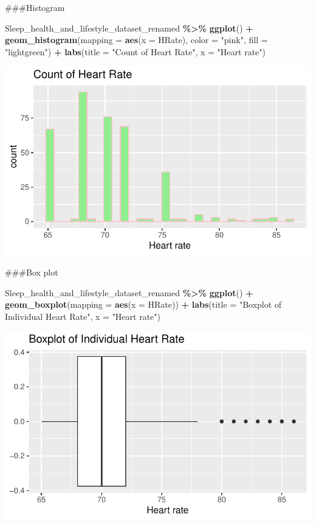 \documentclass[
  11pt,
]{article}
\newenvironment{Shaded}{\begin{snugshade}}{\end{snugshade}}
\newcommand{\AttributeTok}[1]{\textcolor[rgb]{0.13,0.29,0.53}{#1}}
\newcommand{\FunctionTok}[1]{\textcolor[rgb]{0.13,0.29,0.53}{\textbf{#1}}}
\newcommand{\NormalTok}[1]{#1}
\newcommand{\SpecialCharTok}[1]{\textcolor[rgb]{0.81,0.36,0.00}{\textbf{#1}}}
\newcommand{\StringTok}[1]{\textcolor[rgb]{0.31,0.60,0.02}{#1}}
\begin{document}
\#\#\#Histogram

\begin{Shaded}
\begin{Highlighting}[]
\NormalTok{Sleep\_health\_and\_lifestyle\_dataset\_renamed }\SpecialCharTok{\%\textgreater{}\%}
  \FunctionTok{ggplot}\NormalTok{() }\SpecialCharTok{+}
    \FunctionTok{geom\_histogram}\NormalTok{(}\AttributeTok{mapping =} \FunctionTok{aes}\NormalTok{(}\AttributeTok{x =}\NormalTok{ HRate), }\AttributeTok{color =} \StringTok{"pink"}\NormalTok{, }\AttributeTok{fill =} \StringTok{"lightgreen"}\NormalTok{) }\SpecialCharTok{+}
    \FunctionTok{labs}\NormalTok{(}\AttributeTok{title =} \StringTok{"Count of Heart Rate"}\NormalTok{, }\AttributeTok{x =} \StringTok{"Heart rate"}\NormalTok{) }
\end{Highlighting}
\end{Shaded}

\begin{center}\includegraphics[width=0.7\linewidth]{SleepHelath_files/figure-latex/unnamed-chunk-7-1} \end{center}

\#\#\#Box plot

\begin{Shaded}
\begin{Highlighting}[]
\NormalTok{Sleep\_health\_and\_lifestyle\_dataset\_renamed }\SpecialCharTok{\%\textgreater{}\%}
  \FunctionTok{ggplot}\NormalTok{() }\SpecialCharTok{+}
    \FunctionTok{geom\_boxplot}\NormalTok{(}\AttributeTok{mapping =} \FunctionTok{aes}\NormalTok{(}\AttributeTok{x =}\NormalTok{ HRate)) }\SpecialCharTok{+}
    \FunctionTok{labs}\NormalTok{(}\AttributeTok{title =} \StringTok{"Boxplot of Individual Heart Rate"}\NormalTok{, }\AttributeTok{x =} \StringTok{"Heart rate"}\NormalTok{)}
\end{Highlighting}
\end{Shaded}

\begin{center}\includegraphics[width=0.7\linewidth]{SleepHelath_files/figure-latex/unnamed-chunk-8-1} \end{center}
\end{document}
